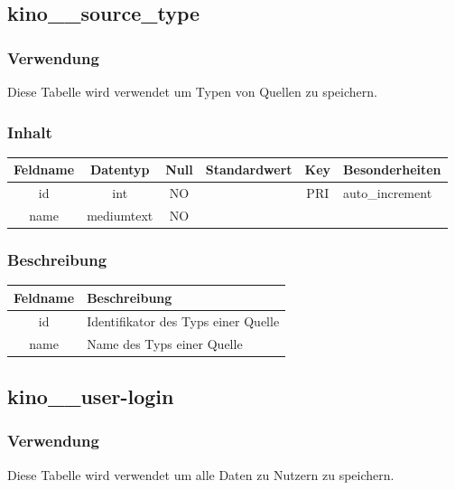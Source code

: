 \subsection{kino\_\_source\_type}
\subsubsection{Verwendung} Diese Tabelle wird verwendet um Typen von Quellen zu speichern.
\subsubsection{Inhalt}
\begin{table}[H]
	\begin{tabular}{|c|c|c|c|c|p{3.5cm}|}
		\hline
		\textbf{Feldname} & \textbf{Datentyp} & \textbf{Null} & \textbf{Standardwert} & \textbf{Key}   & \textbf{Besonderheiten} \\ \hline
		id & int & NO &  & PRI & auto\_increment \\ \hline
		name & mediumtext & NO &  &  & \\ \hline
	\end{tabular}
\end{table}
\subsubsection{Beschreibung}
\begin{table}[H]
	\begin{tabular}{|c|p{12cm}|}
		\hline
		\textbf{Feldname} & \textbf{Beschreibung} \\ \hline
		id & Identifikator des Typs einer Quelle \\ \hline
		name & Name des Typs einer Quelle \\ \hline
	\end{tabular}
\end{table}
\subsection{kino\_\_user-login}
\subsubsection{Verwendung} Diese Tabelle wird verwendet um alle Daten zu Nutzern zu speichern.
